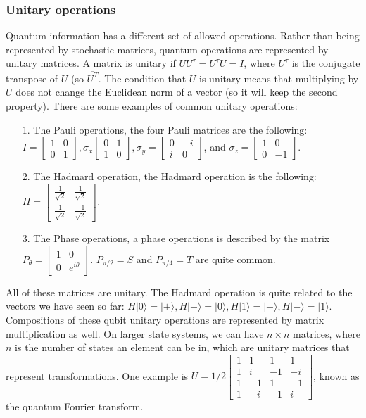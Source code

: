 \documentclass{amsart}
\begin{document}
\subsubsection*{Unitary operations}
Quantum information has a different set of allowed operations. Rather than being represented
by stochastic matrices, quantum operations are represented by unitary matrices. A matrix is
unitary if $ UU^{\tau} = U^{\tau}U = I $, where $ U^{\tau} $ is the conjugate transpose of $
U $ (so $ \overline{U^T} $. The condition that $ U $ is unitary means that multiplying by $ U
$ does not change the Euclidean norm of a vector (so it will keep the second property).
There are some examples of common unitary operations:
\begin{itemize}
\item[1.] The Pauli operations, the four Pauli matrices are the following:
$ I = \begin{bmatrix} 1 & 0 \\ 0 & 1 \end{bmatrix}, \sigma_x \begin{bmatrix} 0 & 1 \\ 1 & 0 
\end{bmatrix}, \sigma_y = \begin{bmatrix} 0 & -i \\ i & 0 \end{bmatrix} $, and
$ \sigma_z = \begin{bmatrix} 1 & 0 \\ 0 & -1 \end{bmatrix} $. \\
\item[2.] The Hadmard operation, the Hadmard operation is the following:
$ H = \begin{bmatrix}
\frac{1}{\sqrt{2}} & \frac{1}{\sqrt{2}} \\ \frac{1}{\sqrt{2}} & \frac{-1}{\sqrt{2}}
\end{bmatrix} $. \\
\item[3.] The Phase operations, a phase operations is described by the matrix
$ P_{\theta} = \begin{bmatrix}
1 & 0 \\ 0 & e^{i\theta}
\end{bmatrix} $. $ P_{\pi/2} = S $ and $ P_{\pi/4} = T $ are quite common.
\end{itemize}
All of these matrices are unitary. The Hadmard operation is quite related to the vectors we
have seen so far: $ H |0\rangle = |+\rangle, H |+\rangle = |0\rangle, H|1\rangle = |-\rangle,
H|-\rangle = |1\rangle $. \\
Compositions of these qubit unitary operations are represented by matrix multiplication as
well. On larger state systems, we can have $ n \times n $ matrices, where $ n $ is the number
of states an element can be in, which are unitary matrices that represent transformations. One
example is $ U = 1/2 \begin{bmatrix}
1 & 1 & 1 & 1 \\ 1 & i & -1 & -i \\ 1 & -1 & 1 & -1 \\ 1 & -i & -1 & i
\end{bmatrix} $, known as the quantum Fourier transform.
\end{document}
